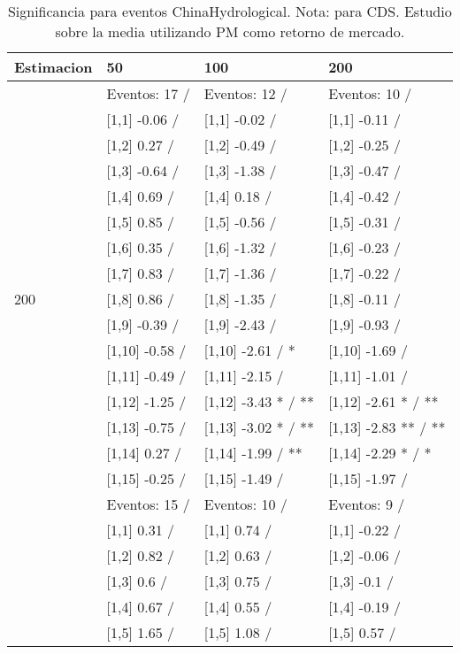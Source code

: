 \begin{table}

\caption{Significancia para eventos ChinaHydrological. Nota: para CDS. Estudio sobre la media utilizando PM como retorno de mercado.}
\centering
\begin{tabular}[t]{llll}
\toprule
Estimacion & 50 & 100 & 200\\
\midrule
 & Eventos:  17 / & Eventos:  12 / & Eventos:  10 /\\
 & {}[1,1] -0.06  / & {}[1,1] -0.02  / & {}[1,1] -0.11  /\\
 & {}[1,2] 0.27  / & {}[1,2] -0.49  / & {}[1,2] -0.25  /\\
 & {}[1,3] -0.64  / & {}[1,3] -1.38  / & {}[1,3] -0.47  /\\
 & {}[1,4] 0.69  / & {}[1,4] 0.18  / & {}[1,4] -0.42  /\\
\addlinespace
 & {}[1,5] 0.85  / & {}[1,5] -0.56  / & {}[1,5] -0.31  /\\
 & {}[1,6] 0.35  / & {}[1,6] -1.32  / & {}[1,6] -0.23  /\\
 & {}[1,7] 0.83  / & {}[1,7] -1.36  / & {}[1,7] -0.22  /\\
200 & {}[1,8] 0.86  / & {}[1,8] -1.35  / & {}[1,8] -0.11  /\\
 & {}[1,9] -0.39  / & {}[1,9] -2.43  / & {}[1,9] -0.93  /\\
\addlinespace
 & {}[1,10] -0.58  / & {}[1,10] -2.61  / * & {}[1,10] -1.69  /\\
 & {}[1,11] -0.49  / & {}[1,11] -2.15  / & {}[1,11] -1.01  /\\
 & {}[1,12] -1.25  / & {}[1,12] -3.43 * / ** & {}[1,12] -2.61 * / **\\
 & {}[1,13] -0.75  / & {}[1,13] -3.02 * / ** & {}[1,13] -2.83 ** / **\\
 & {}[1,14] 0.27  / & {}[1,14] -1.99  / ** & {}[1,14] -2.29 * / *\\
\addlinespace
 & {}[1,15] -0.25  / & {}[1,15] -1.49  / & {}[1,15] -1.97  /\\
 & Eventos:  15 / & Eventos:  10 / & Eventos:  9 /\\
 & {}[1,1] 0.31  / & {}[1,1] 0.74  / & {}[1,1] -0.22  /\\
 & {}[1,2] 0.82  / & {}[1,2] 0.63  / & {}[1,2] -0.06  /\\
 & {}[1,3] 0.6  / & {}[1,3] 0.75  / & {}[1,3] -0.1  /\\
\addlinespace
 & {}[1,4] 0.67  / & {}[1,4] 0.55  / & {}[1,4] -0.19  /\\
 & {}[1,5] 1.65  / & {}[1,5] 1.08  / & {}[1,5] 0.57  /\\

\end{tabular}
\end{table}
